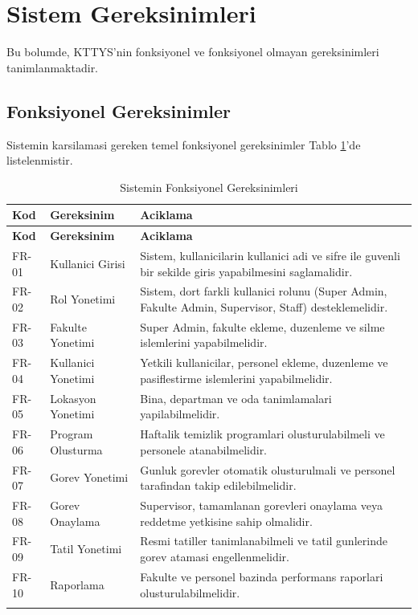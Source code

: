\section{Sistem Gereksinimleri}
\label{sec:sistem-gereksinimleri}

Bu bolumde, KTTYS'nin fonksiyonel ve fonksiyonel olmayan 
gereksinimleri tanimlanmaktadir.

\subsection{Fonksiyonel Gereksinimler}
\label{subsec:fonksiyonel-gereksinimler}

Sistemin karsilamasi gereken temel fonksiyonel gereksinimler 
Tablo \ref{tab:fonksiyonel-gereksinimler}'de listelenmistir.

\begin{longtable}{|p{1.5cm}|p{3cm}|p{8cm}|}
\hline
\textbf{Kod} & \textbf{Gereksinim} & \textbf{Aciklama} \\
\hline
\endfirsthead
\hline
\textbf{Kod} & \textbf{Gereksinim} & \textbf{Aciklama} \\
\hline
\endhead
\hline
\endfoot

FR-01 & Kullanici Girisi & Sistem, kullanicilarin kullanici adi ve 
sifre ile guvenli bir sekilde giris yapabilmesini saglamalidir. \\
\hline
FR-02 & Rol Yonetimi & Sistem, dort farkli kullanici rolunu (Super 
Admin, Fakulte Admin, Supervisor, Staff) desteklemelidir. \\
\hline
FR-03 & Fakulte Yonetimi & Super Admin, fakulte ekleme, duzenleme 
ve silme islemlerini yapabilmelidir. \\
\hline
FR-04 & Kullanici Yonetimi & Yetkili kullanicilar, personel ekleme, 
duzenleme ve pasiflestirme islemlerini yapabilmelidir. \\
\hline
FR-05 & Lokasyon Yonetimi & Bina, departman ve oda tanimlamalari 
yapilabilmelidir. \\
\hline
FR-06 & Program Olusturma & Haftalik temizlik programlari 
olusturulabilmeli ve personele atanabilmelidir. \\
\hline
FR-07 & Gorev Yonetimi & Gunluk gorevler otomatik olusturulmali 
ve personel tarafindan takip edilebilmelidir. \\
\hline
FR-08 & Gorev Onaylama & Supervisor, tamamlanan gorevleri onaylama 
veya reddetme yetkisine sahip olmalidir. \\
\hline
FR-09 & Tatil Yonetimi & Resmi tatiller tanimlanabilmeli ve 
tatil gunlerinde gorev atamasi engellenmelidir. \\
\hline
FR-10 & Raporlama & Fakulte ve personel bazinda performans 
raporlari olusturulabilmelidir. \\
\hline

\caption{Sistemin Fonksiyonel Gereksinimleri}
\label{tab:fonksiyonel-gereksinimler}
\end{longtable}

